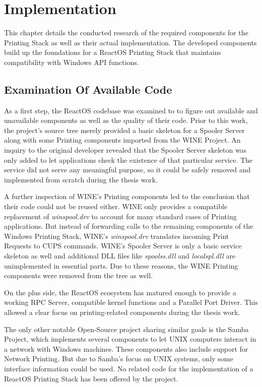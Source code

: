 \chapter{Implementation}
\label{chp:implementation}
This chapter details the conducted research of the required components for the Printing Stack as well as their actual implementation.
The developed components build up the foundations for a ReactOS Printing Stack that maintains compatibility with Windows \gls{API} functions.


\section{Examination Of Available Code}
As a first step, the ReactOS codebase was examined to to figure out available and unavailable components as well as the quality of their code.
Prior to this work, the project's source tree merely provided a basic skeleton for a Spooler Server along with some Printing components imported from the WINE Project.
An inquiry to the original developer revealed that the Spooler Server skeleton was only added to let applications check the existence of that particular service.
The service did not serve any meaningful purpose, so it could be safely removed and implemented from scratch during the thesis work.

A further inspection of WINE's Printing components led to the conclusion that their code could not be reused either.
WINE only provides a compatible replacement of \emph{winspool.drv} to account for many standard cases of Printing applications.
But instead of forwarding calls to the remaining components of the Windows Printing Stack, WINE's \emph{winspool.drv} translates incoming Print Requests to \gls{CUPS} commands.
WINE's Spooler Server is only a basic service skeleton as well and additional \gls{DLL} files like \emph{spoolss.dll} and \emph{localspl.dll} are unimplemented in essential parts.
Due to these reasons, the WINE Printing components were removed from the tree as well.

On the plus side, the ReactOS ecosystem has matured enough to provide a working \gls{RPC} Server, compatible kernel functions and a Parallel Port Driver.
This allowed a clear focus on printing-related components during the thesis work.

The only other notable Open-Source project sharing similar goals is the Samba Project, which implements several components to let UNIX computers interact in a network with Windows machines.
These components also include support for Network Printing.
But due to Samba's focus on UNIX systems, only some interface information could be used.
No related code for the implementation of a ReactOS Printing Stack has been offered by the project.

